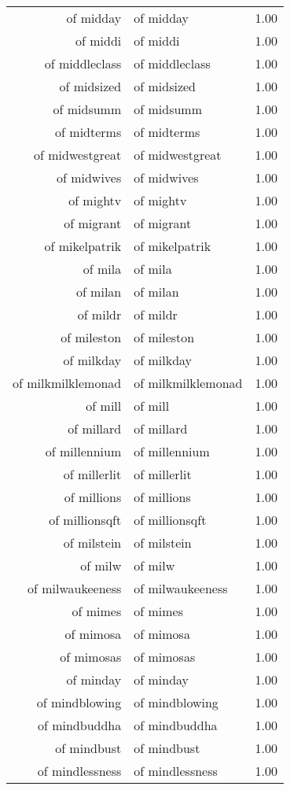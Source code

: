 \begin{table}[ht]
\begin{tabular}{rlr}
  of midday & of midday & 1.00 \\ 
  of middi & of middi & 1.00 \\ 
  of middleclass & of middleclass & 1.00 \\ 
  of midsized & of midsized & 1.00 \\ 
  of midsumm & of midsumm & 1.00 \\ 
  of midterms & of midterms & 1.00 \\ 
  of midwestgreat & of midwestgreat & 1.00 \\ 
  of midwives & of midwives & 1.00 \\ 
  of mightv & of mightv & 1.00 \\ 
  of migrant & of migrant & 1.00 \\ 
  of mikelpatrik & of mikelpatrik & 1.00 \\ 
  of mila & of mila & 1.00 \\ 
  of milan & of milan & 1.00 \\ 
  of mildr & of mildr & 1.00 \\ 
  of mileston & of mileston & 1.00 \\ 
  of milkday & of milkday & 1.00 \\ 
  of milkmilklemonad & of milkmilklemonad & 1.00 \\ 
  of mill & of mill & 1.00 \\ 
  of millard & of millard & 1.00 \\ 
  of millennium & of millennium & 1.00 \\ 
  of millerlit & of millerlit & 1.00 \\ 
  of millions & of millions & 1.00 \\ 
  of millionsqft & of millionsqft & 1.00 \\ 
  of milstein & of milstein & 1.00 \\ 
  of milw & of milw & 1.00 \\ 
  of milwaukeeness & of milwaukeeness & 1.00 \\ 
  of mimes & of mimes & 1.00 \\ 
  of mimosa & of mimosa & 1.00 \\ 
  of mimosas & of mimosas & 1.00 \\ 
  of minday & of minday & 1.00 \\ 
  of mindblowing & of mindblowing & 1.00 \\ 
  of mindbuddha & of mindbuddha & 1.00 \\ 
  of mindbust & of mindbust & 1.00 \\ 
  of mindlessness & of mindlessness & 1.00 \\ 

\end{tabular}
\end{table}
